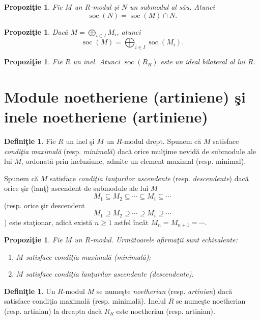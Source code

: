 \documentclass[12pt,a4paper]{book}
\DeclareMathOperator{\soc}{soc}
\theoremstyle{plain}
\newtheorem{proposition}[theorem]{Propoziţie}
\theoremstyle{definition}
\newtheorem{definition}[theorem]{Definiţie}
\theoremstyle{remark}
\begin{document}
\begin{proposition}
Fie \(M\) un \(R\)-modul şi \(N\) un submodul al său. Atunci
\[
  \soc(N) = \soc(M) \cap N.
\]
\end{proposition}

\begin{proposition}
Dacă \(M = \bigoplus_{i\in I} M_i\), atunci
\[
  \soc(M) = \bigoplus_{i\in I} \soc(M_i).
\]
\end{proposition}

\begin{proposition}
Fie \(R\) un inel. Atunci \(\soc(R_R)\) este un ideal bilateral al lui \(R\).
\end{proposition}



\section{Module noetheriene (artiniene) şi inele noetheriene (artiniene)}

\begin{definition}
Fie \(R\) un inel şi \(M\) un \(R\)-modul drept. Spunem că \(M\) satisface
\emph{condiţia maximală} (resp. \emph{minimală}) dacă orice mulţime nevidă de
submodule ale lui \(M\), ordonată prin incluziune, admite un element maximal
(resp. minimal).

Spunem că \(M\) satisface \emph{condiţia lanţurilor ascendente} (resp.
\emph{descendente}) dacă orice şir (lanţ) ascendent de submodule ale lui \(M\)
\[
  M_1 \subseteq M_2 \subseteq \cdots \subseteq M_i \subseteq \cdots
\]
(resp. orice şir descendent
\[
  M_1 \supseteq M_2 \supseteq \cdots \supseteq M_i \supseteq \cdots
\])
este staţionar, adică există \(n \ge 1\) astfel încât
\(M_n = M_{n+1} = \cdots\).
\end{definition}

\begin{proposition}
Fie \(M\) un \(R\)-modul. Următoarele afirmaţii sunt echivalente:
\begin{enumerate}
  \item \(M\) satisface condiţia maximală (minimală);
  \item \(M\) satisface condiţia lanţurilor ascendente (descendente).
\end{enumerate}
\end{proposition}

\begin{definition}
Un \(R\)-modul \(M\) se numeşte \emph{noetherian} (resp. \emph{artinian}) dacă
satisface condiţia maximală (resp. minimală). Inelul \(R\) se numeşte
noetherian (resp. artinian) la dreapta dacă \(R_R\) este noetherian
(resp. artinian).
\end{definition}
\end{document}
